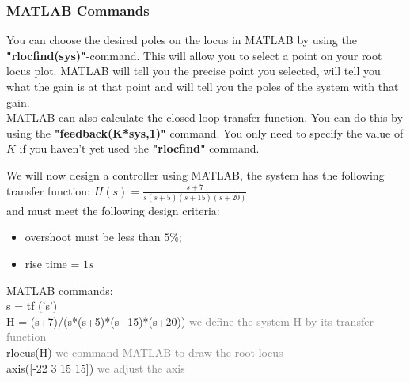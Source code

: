 \begin{frame}
\frametitle{MATLAB Commands}
	You can choose the desired poles on the locus in MATLAB by using the \textbf{"rlocfind(sys)"}-command. This will allow you to select a point on your root locus plot. MATLAB will tell you the precise point you selected, will tell you what the gain is at that point and will tell you the poles of the system with that gain.\\
	\vspace{1em}
	MATLAB can also calculate the closed-loop transfer function. You can do this by using the \textbf{"feedback(K*sys,1)"} command. You only need to specify the value of $K$ if you haven't yet used the \textbf{"rlocfind"} command.
\end{frame}

\begin{frame}
	\begin{example}
		We will now design a controller using MATLAB, the system has the following transfer function: $H(s) = \frac{s+7}{s(s+5)(s+15)(s+20)}$\\
		and must meet the following design criteria: 
		\begin{itemize}
			\item overshoot must be less than $5\%$;
			\item rise time = $1s$
		\end{itemize}
		MATLAB commands:\\
		s = tf ('s') \\
		H = (s+7)/(s*(s+5)*(s+15)*(s+20)) \textcolor{gray}{we define the system H by its transfer function} \\
		rlocus(H) \textcolor{gray}{we command MATLAB to draw the root locus} \\
		axis([-22 3 15 15])	\textcolor{gray}{we adjust the axis} \\
	\end{example}
\end{frame}

